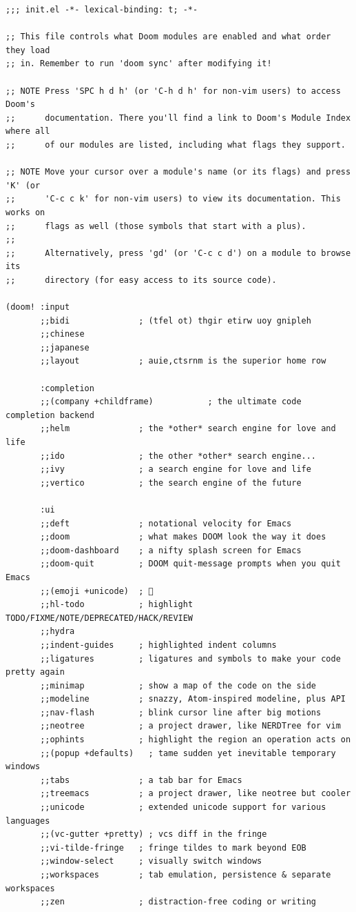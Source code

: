 \documentclass[11pt]{article}
\begin{document}
\begin{verbatim}
;;; init.el -*- lexical-binding: t; -*-

;; This file controls what Doom modules are enabled and what order they load
;; in. Remember to run 'doom sync' after modifying it!

;; NOTE Press 'SPC h d h' (or 'C-h d h' for non-vim users) to access Doom's
;;      documentation. There you'll find a link to Doom's Module Index where all
;;      of our modules are listed, including what flags they support.

;; NOTE Move your cursor over a module's name (or its flags) and press 'K' (or
;;      'C-c c k' for non-vim users) to view its documentation. This works on
;;      flags as well (those symbols that start with a plus).
;;
;;      Alternatively, press 'gd' (or 'C-c c d') on a module to browse its
;;      directory (for easy access to its source code).

(doom! :input
       ;;bidi              ; (tfel ot) thgir etirw uoy gnipleh
       ;;chinese
       ;;japanese
       ;;layout            ; auie,ctsrnm is the superior home row

       :completion
       ;;(company +childframe)           ; the ultimate code completion backend
       ;;helm              ; the *other* search engine for love and life
       ;;ido               ; the other *other* search engine...
       ;;ivy               ; a search engine for love and life
       ;;vertico           ; the search engine of the future

       :ui
       ;;deft              ; notational velocity for Emacs
       ;;doom              ; what makes DOOM look the way it does
       ;;doom-dashboard    ; a nifty splash screen for Emacs
       ;;doom-quit         ; DOOM quit-message prompts when you quit Emacs
       ;;(emoji +unicode)  ; 🙂
       ;;hl-todo           ; highlight TODO/FIXME/NOTE/DEPRECATED/HACK/REVIEW
       ;;hydra
       ;;indent-guides     ; highlighted indent columns
       ;;ligatures         ; ligatures and symbols to make your code pretty again
       ;;minimap           ; show a map of the code on the side
       ;;modeline          ; snazzy, Atom-inspired modeline, plus API
       ;;nav-flash         ; blink cursor line after big motions
       ;;neotree           ; a project drawer, like NERDTree for vim
       ;;ophints           ; highlight the region an operation acts on
       ;;(popup +defaults)   ; tame sudden yet inevitable temporary windows
       ;;tabs              ; a tab bar for Emacs
       ;;treemacs          ; a project drawer, like neotree but cooler
       ;;unicode           ; extended unicode support for various languages
       ;;(vc-gutter +pretty) ; vcs diff in the fringe
       ;;vi-tilde-fringe   ; fringe tildes to mark beyond EOB
       ;;window-select     ; visually switch windows
       ;;workspaces        ; tab emulation, persistence & separate workspaces
       ;;zen               ; distraction-free coding or writing


\end{verbatim}
\end{document}
